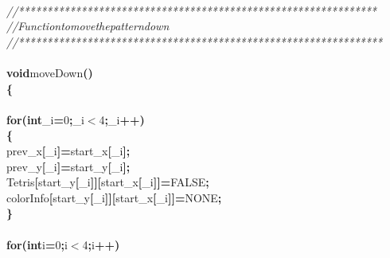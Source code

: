 \documentclass[a4paper, 10pt]{article}
\newcommand\SPC{\hspace*{0.6em}}
\newcommand{\CppAComment}[1]{\textit{\textcolor[rgb]{0.2,0.6,1}{#1}}}
\newcommand{\CppAIdentifier}[1]{#1}
\newcommand{\CppANumber}[1]{\textcolor[rgb]{0.5,0,0.5}{#1}}
\newcommand{\CppAReservedWord}[1]{\textbf{#1}}
\newcommand{\CppASpace}[1]{\colorbox[rgb]{1,1,1}{#1}}
\newcommand{\CppASymbol}[1]{\textbf{\textcolor[rgb]{1,0,0}{#1}}}
\begin{document}
\begin{ttfamily}
\\
\CppAComment{//***************************************************************}\\
\CppAComment{//\SPC \SPC \SPC Function\SPC to\SPC move\SPC the\SPC pattern\SPC down}\\
\CppAComment{//****************************************************************}\\
\\
\CppAReservedWord{void}\CppASpace{\SPC }\CppAIdentifier{moveDown}\CppASymbol{(}\CppASymbol{)}\\
\CppASymbol{\{}\\
\\
\CppASpace{\SPC }\CppAReservedWord{for}\CppASymbol{(}\CppAReservedWord{int}\CppASpace{\SPC }\CppAIdentifier{\_i}\CppASymbol{=}\CppANumber{0}\CppASymbol{;}\CppAIdentifier{\_i}\CppASymbol{$<$}\CppANumber{4}\CppASymbol{;}\CppAIdentifier{\_i}\CppASymbol{++}\CppASymbol{)}\\
\CppASpace{\SPC }\CppASymbol{\{}\\
\CppASpace{\SPC \SPC }\CppAIdentifier{prev\_x}\CppASymbol{[}\CppAIdentifier{\_i}\CppASymbol{]}\CppASymbol{=}\CppAIdentifier{start\_x}\CppASymbol{[}\CppAIdentifier{\_i}\CppASymbol{]}\CppASymbol{;}\\
\CppASpace{\SPC \SPC }\CppAIdentifier{prev\_y}\CppASymbol{[}\CppAIdentifier{\_i}\CppASymbol{]}\CppASymbol{=}\CppAIdentifier{start\_y}\CppASymbol{[}\CppAIdentifier{\_i}\CppASymbol{]}\CppASymbol{;}\\
\CppASpace{\SPC \SPC }\CppAIdentifier{Tetris}\CppASymbol{[}\CppAIdentifier{start\_y}\CppASymbol{[}\CppAIdentifier{\_i}\CppASymbol{]}\CppASymbol{]}\CppASymbol{[}\CppAIdentifier{start\_x}\CppASymbol{[}\CppAIdentifier{\_i}\CppASymbol{]}\CppASymbol{]}\CppASymbol{=}\CppAIdentifier{FALSE}\CppASymbol{;}\\
\CppASpace{\SPC \SPC }\CppAIdentifier{colorInfo}\CppASymbol{[}\CppAIdentifier{start\_y}\CppASymbol{[}\CppAIdentifier{\_i}\CppASymbol{]}\CppASymbol{]}\CppASymbol{[}\CppAIdentifier{start\_x}\CppASymbol{[}\CppAIdentifier{\_i}\CppASymbol{]}\CppASymbol{]}\CppASymbol{=}\CppAIdentifier{NONE}\CppASymbol{;}\\
\CppASpace{\SPC }\CppASymbol{\}}\\
\\
\CppASpace{\SPC }\CppAReservedWord{for}\CppASymbol{(}\CppAReservedWord{int}\CppASpace{\SPC }\CppAIdentifier{i}\CppASymbol{=}\CppANumber{0}\CppASymbol{;}\CppAIdentifier{i}\CppASymbol{$<$}\CppANumber{4}\CppASymbol{;}\CppAIdentifier{i}\CppASymbol{++}\CppASymbol{)}\\

\end{ttfamily}
\end{document}
